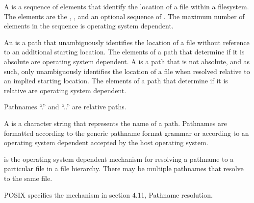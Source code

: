 \pnum
A  is
a sequence of elements that identify
the location of a file within a filesystem.
The elements are the
,
,
and an optional sequence of .
The maximum number of elements in the sequence is
operating system dependent.

\pnum
An  is a path that unambiguously
identifies the location of a file without reference to an additional starting
location. The elements of a path that determine if it is absolute are
operating system dependent.
A  is
a path that is not absolute, and as such, only unambiguously
identifies the location of a file when resolved relative to
an implied starting location. The elements of a path that determine if it is
relative are operating system dependent.
\begin{note}
Pathnames ``.'' and ``..'' are relative paths.
\end{note}

\pnum
A  is
a character string that represents the name of a path. Pathnames are
formatted according to the generic pathname format grammar
or according to an
operating system dependent
 accepted by the host operating system.

\pnum
{}
is the operating system dependent mechanism for resolving
a pathname to a particular file in a file hierarchy. There may be multiple
pathnames that resolve to the same file.
\begin{example}
POSIX specifies the mechanism in section 4.11, Pathname resolution.
\end{example}

